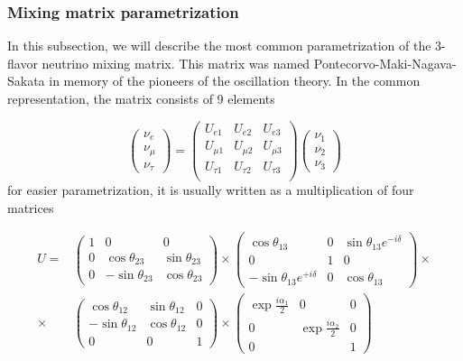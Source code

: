 \documentclass[../main.tex]{subfiles}
\begin{document}
\subsubsection{Mixing matrix parametrization}
In this subsection, we will describe the most common parametrization of the 3-flavor neutrino mixing matrix. This matrix was named Pontecorvo-Maki-Nagava-Sakata in memory of the pioneers of the oscillation theory. In the common representation, the matrix consists of 9 elements

\begin{equation}
\begin{pmatrix}
\nu_e \\ \nu_\mu \\ \nu_\tau
\end{pmatrix}
=
\begin{pmatrix}
U_{e1} & U_{e2} & U_{e3} \\
U_{\mu 1} & U_{\mu 2} & U_{\mu 3} \\
U_{\tau 1} & U_{\tau 2} & U_{\tau 3} \\
\end{pmatrix}
\begin{pmatrix}
\nu_1 \\ \nu_2 \\ \nu_3
\end{pmatrix}
\end{equation}
for easier parametrization, it is usually written as a multiplication of four matrices

\begin{align}
\nonumber
U=&
\begin{pmatrix}
1   & 0                 & 0 \\
0   & \cos\theta_{23}   & \sin\theta_{23} \\
0   & -\sin\theta_{23}  & \cos\theta_{23}
\end{pmatrix}
\times
\begin{pmatrix}
\cos\theta_{13}                           & 0     & \sin\theta_{13}e^{-i\delta} \\
0                                         & 1     & 0 \\
-\sin\theta_{13}e^{+i\delta}              & 0     & \cos\theta_{13}
\end{pmatrix} \times \\
\times &
\begin{pmatrix}
\cos\theta_{12}   & \sin\theta_{12} & 0 \\
-\sin\theta_{12}  & \cos\theta_{12} & 0 \\
0                 & 0               & 1
\end{pmatrix}
\times
\begin{pmatrix}
\exp\frac{i\alpha_1}{2}   & 0                         & 0 \\
0                         & \exp\frac{i\alpha_2}{2}   & 0 \\
0                         &                           & 1
\end{pmatrix}
\label{eq:intro:osc_param}
\end{align}
\end{document}
